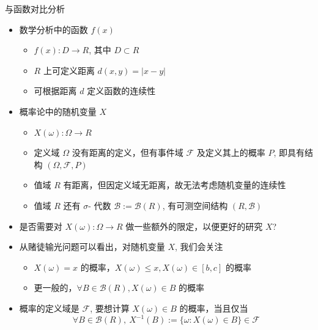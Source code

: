 \begin{frame}{与函数对比分析}
	\begin{itemize}[<+-|alert@+>]
		\item 数学分析中的函数 $f (x)$
		      \begin{itemize}[<+-|alert@+>]
			      \item $f (x):D\rightarrow R$, 其中 $D\subset R$
			      \item $R$ 上可定义距离 $d (x,y)=|x-y|$
			      \item 可根据距离 $d$ 定义函数的连续性 %
		      \end{itemize}
		\item 概率论中的随机变量 $X$
		      \begin{itemize}[<+-|alert@+>]
			      \item $X(\omega):\Omega\rightarrow R$
			      \item 定义域 $\Omega$ 没有距离的定义，\pause 但有事件域 $\mathcal{F}$ 及定义其上的概率 $P$, 即具有结构 $(\Omega, \mathcal{F}, P)$\pause
			      \item 值域 $R$ 有距离，\pause 但因定义域无距离，故无法考虑随机变量的连续性 \pause
			      \item 值域 $R$ 还有 $\sigma$- 代数 $\mathcal{B}:=\mathcal{B}(R)$, 有可测空间结构 $(R,\mathcal{B})$
		      \end{itemize}
		\item 是否需要对 $X (\omega):\Omega\rightarrow R$ 做一些额外的限定，以便更好的研究 $X$?
		\item 从赌徒输光问题可以看出，对随机变量 $X$, 我们会关注
		      \begin{itemize}[<+-|alert@+>]
			      \item $X (\omega)=x$ 的概率，\pause $X (\omega)\leq x, X (\omega)\in [b,c]$ 的概率 \pause
			      \item 更一般的，$\forall B\in\mathcal{B}(R), X (\omega)\in B$ 的概率
		      \end{itemize}
		\item 概率的定义域是 $\mathcal{F}$, 要想计算 $X (\omega)\in B$ 的概率，当且仅当
		      \[\forall B\in\mathcal{B}(R), \ X^{-1}(B):=\{\omega: X(\omega)\in B\}\in\mathcal{F}\]
	\end{itemize}
\end{frame}






